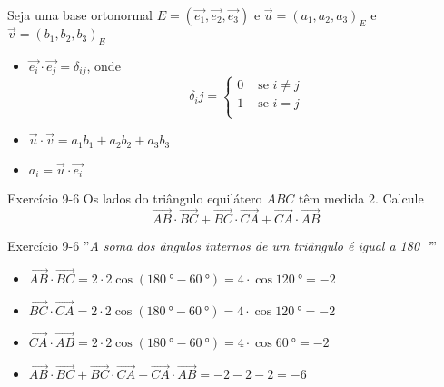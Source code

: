 \begin{frame}{}
    Seja uma base ortonormal \(E=(\vec{e_1},\vec{e_2},\vec{e_3})\) e \(\vec{u}=(a_1,a_2,a_3)_E\) e \(\vec{v}=(b_1,b_2,b_3)_E\)
    \begin{itemize}
        \item \(\vec{e_i}\cdot\vec{e_j}=\delta_{ij}\), onde
            \[
                \delta_ij=%
                \begin{cases}
                    0 &\text{ se } i \neq j \\
                    1 &\text{ se } i = j\\
                \end{cases}
            \]
        \item \(\vec{u}\cdot\vec{v}=a_1 b_1 +a_2 b_2 + a_3 b_3\)
        \item \(a_i = \vec{u}\cdot\vec{e_i}\)
    \end{itemize}

\end{frame}

\begin{frame}[c]{Exercício 9-6}
    Os lados do triângulo equilátero \(ABC\) têm medida 2. Calcule
    \[
        \vec{AB}\cdot\vec{BC}+\vec{BC}\cdot\vec{CA}+\vec{CA}\cdot\vec{AB}
    \]
\end{frame}

\begin{frame}{Exercício 9-6}
    ''\textit{A soma dos ângulos internos de um triângulo é igual a \SI{180}{\degree}}''
    \begin{center}
    \end{center}
    \begin{itemize}
        \item \(
            \vec{AB}\cdot\vec{BC}=
            2\cdot 2 \cos{(\SI{180}{\degree}-\SI{60}{\degree})}=
            4\cdot\cos{\SI{120}{\degree}}=-2
            \)
        \item \(
            \vec{BC}\cdot\vec{CA}=
            2\cdot 2 \cos{(\SI{180}{\degree}-\SI{60}{\degree})}=
            4\cdot\cos{\SI{120}{\degree}}=-2
            \)
        \item \(
            \vec{CA}\cdot\vec{AB}=
            2\cdot 2 \cos{(\SI{180}{\degree}-\SI{60}{\degree})}=
            4\cdot\cos{\SI{60}{\degree}}=-2
            \)
        \item \(\vec{AB}\cdot\vec{BC} + \vec{BC}\cdot\vec{CA} +
            \vec{CA}\cdot\vec{AB}=-2-2-2=-6\)
    \end{itemize}
\end{frame}

